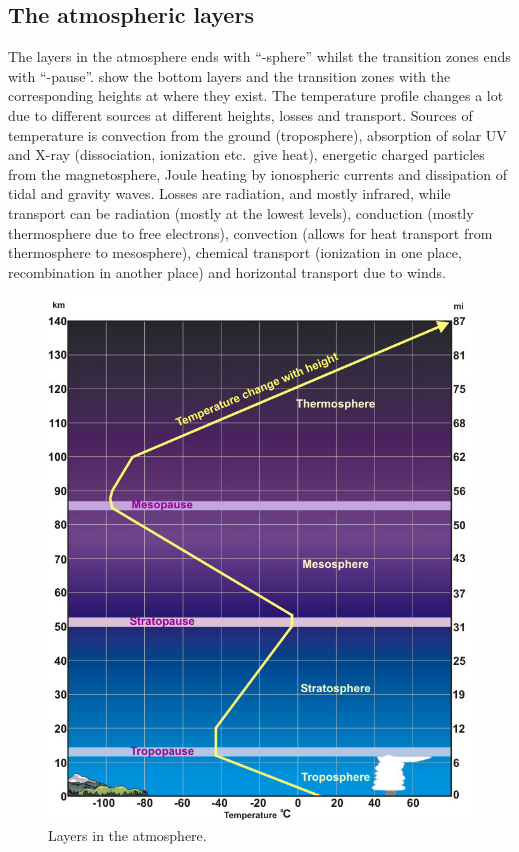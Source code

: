 \subsection{The atmospheric layers}
The layers in the atmosphere ends with ``-sphere'' whilst the transition zones ends with ``-pause''.  show the bottom layers and the transition zones with the corresponding heights at where they exist. The temperature profile changes a lot due to different sources at different heights, losses and transport. Sources of temperature is convection from the ground (troposphere), absorption of solar UV and X-ray (dissociation, ionization etc.\ give heat), energetic charged particles from the magnetosphere, Joule heating by ionospheric currents and dissipation of tidal and gravity waves. Losses are radiation, and mostly infrared, while transport can be radiation (mostly at the lowest levels), conduction (mostly thermosphere due to free electrons), convection (allows for heat transport from thermosphere to mesosphere), chemical transport (ionization in one place, recombination in another place) and horizontal transport due to winds.
\begin{figure}[t]
    \centering
    \includegraphics[width=.4\linewidth]{bilder/L6_atmos_layers.jpg}
    \caption{Layers in the atmosphere.}\label{fig:L6_atmos_layers}
\end{figure}

